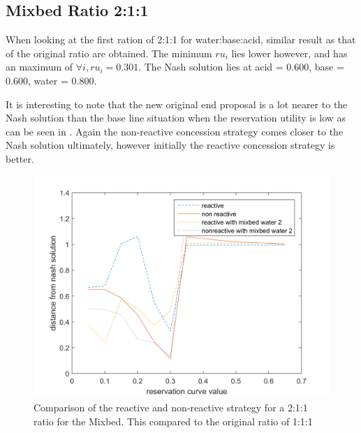\subsection{Mixbed Ratio 2:1:1}
When looking at the first ration of 2:1:1 for water:base:acid, similar result as that of the original ratio are obtained. The minimum $ru_i$ lies lower however, and has an maximum of $\forall i, ru_i = 0.301$. The Nash solution lies at acid = 0.600, base = 0.600, water = 0.800.

It is interesting to note that the new original end proposal is a lot nearer to the Nash solution than the base line situation when the reservation utility is low as can be seen in . Again the non-reactive concession strategy comes closer to the Nash solution ultimately, however initially the reactive concession strategy is better. 
\begin{figure}[h]
	\centering
	\includegraphics[width=0.7\linewidth]{img/reactivevsnonreactiveMixbed2.png}
	\caption{Comparison of the reactive and non-reactive strategy for a 2:1:1 ratio for the Mixbed. This compared to the original ratio of 1:1:1}
	\label{fig:reactivevsnon-reactiveMixbed2}
\end{figure}


